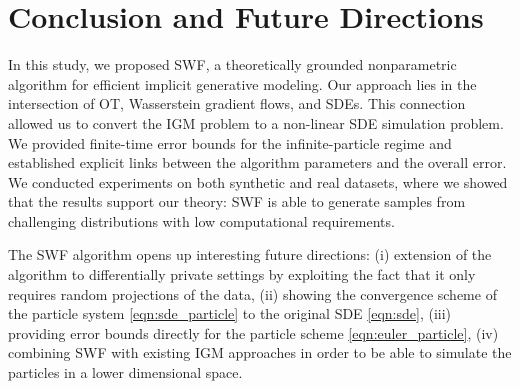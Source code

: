 
\section{Conclusion and Future Directions}

In this study, we proposed SWF, a theoretically grounded nonparametric algorithm for efficient implicit generative modeling. 
Our approach lies in the intersection of OT, Wasserstein gradient flows, and SDEs. This connection allowed us to convert the IGM problem to a non-linear SDE simulation problem. We provided finite-time error bounds for the infinite-particle regime and established explicit links between the algorithm parameters and the overall error. We conducted experiments on both synthetic and real datasets, where we showed that the results support our theory: SWF is able to generate samples from challenging distributions with low computational requirements. 

The SWF algorithm opens up interesting future directions: (i) extension of the algorithm to differentially private settings \cite{dwork2014algorithmic} by exploiting the fact that it only requires random projections of the data, (ii) showing the convergence scheme of the particle system \eqref{eqn:sde_particle} to the original SDE \eqref{eqn:sde}, (iii) providing error bounds directly for the particle scheme \eqref{eqn:euler_particle}, (iv) combining SWF with existing IGM approaches in order to be able to simulate the particles in a lower dimensional space.  
 